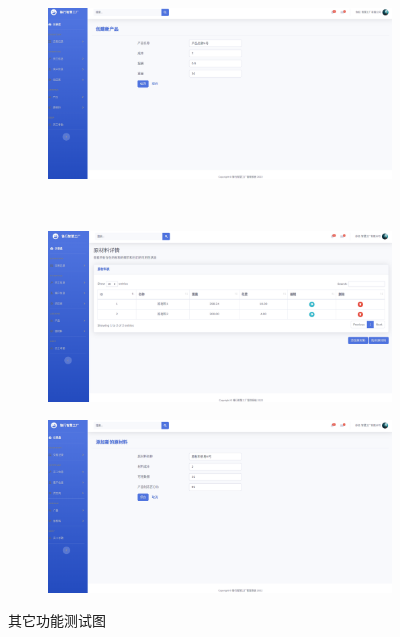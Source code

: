 \begin{figure}[H]
\begin{subfigure}{.35\textwidth}
        \label{fig:vuaprdct}
    \end{subfigure}
    \qquad
    \begin{subfigure}{.35\textwidth}
        \centering
        \includegraphics[width=\textwidth]{figures/6addnewproduct.png}
        \label{fig:adnuprdct}
    \end{subfigure}
    \\
    \begin{subfigure}{.35\textwidth}
        \centering
        \includegraphics[width=\textwidth]{figures/6viewallmaterial.png}
        \label{fig:vuamtra}
    \end{subfigure}
    \qquad
    \begin{subfigure}{.35\textwidth}
        \centering
        \includegraphics[width=\textwidth]{figures/6addnewmaterial.png}
        \label{fig:adnumtra}
    \end{subfigure}
    \caption{其它功能测试图}
    \label{fig:otstst}
\end{figure}

